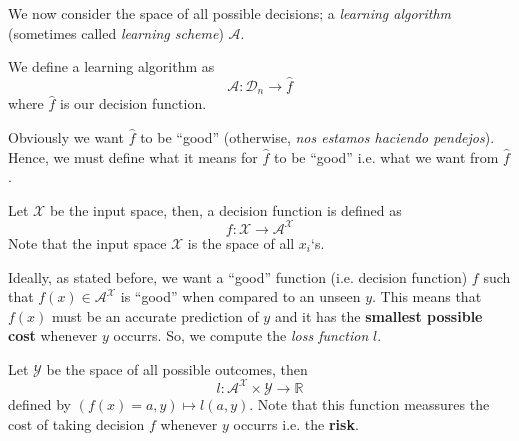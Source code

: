 We now consider the space of all possible decisions; a \textit{learning algorithm }(sometimes called \textit{learning scheme}) $\mathcal{A}$. 

\begin{definition}
    We define a learning algorithm as $$\mathcal{A}: \mathcal{D}_n \rightarrow \hat{f}$$ where $\hat{f}$ is our decision function.
\end{definition}

Obviously we want $\hat{f}$ to be ``good'' (otherwise, \textit{nos estamos haciendo pendejos}). Hence, we must define what it means for $\hat{f}$ to be ``good'' i.e. what we want from $\hat{f}$. 

\begin{definition}
    Let $\mathcal{X}$ be the input space, then, a decision function is defined as $$f:\mathcal{X} \rightarrow \mathcal{A}^{\mathcal{X}}$$ Note that the input space $\mathcal{X}$ is the space of all $x_i$`s.
\end{definition}

Ideally, as stated before, we want a ``good'' function (i.e. decision function) $f$ such that $f(x) \in \mathcal{A}^{\mathcal{X}}$ is ``good'' when compared to an unseen $y$. This means that $f(x)$ must be an accurate prediction of $y$ and it has
the \textbf{smallest possible cost} whenever $y$ occurrs. So, we compute the \textit{loss function} $l$.

\begin{definition}
    Let $\mathcal{Y}$ be the space of all possible outcomes, then $$l:\mathcal{A}^{\mathcal{X}} \times \mathcal{Y} \rightarrow \mathbb{R}$$ defined by $(f(x)=a,y) \mapsto l(a,y)$. Note that this function meassures the cost of taking decision $f$ whenever $y$ occurrs i.e. the \textbf{risk}.
\end{definition}

\cite{judson2019abstract}